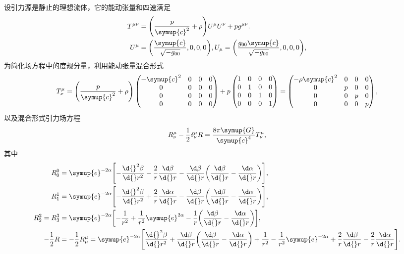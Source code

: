 \documentclass[UTF8, 12pt, a4paper, oneside, onecolumn, fontset=none]{ctexart}
\begin{document}
设引力源是静止的理想流体，它的能动张量和四速满足
\begin{align}
T^{\mu\nu}&=\mleft(\frac{p}{\symup{c}^{2}}+\rho\mright) U^{\mu}U^{\nu}+pg^{\mu\nu}.\\
U^{\mu}&=\mleft(\frac{\symup{c}}{\sqrt{-g_{00}}}, 0, 0, 0\mright), U_{\mu}=\mleft(\frac{g_{00}\symup{c}}{\sqrt{-g_{00}}}, 0, 0, 0\mright),
\end{align}
为简化场方程中的度规分量，利用能动张量混合形式
\begin{equation}
T^{\mu}_{\nu}=\mleft(\frac{p}{\symup{c}^{2}}+\rho\mright)
\begin{pmatrix}
-\symup{c}^{2} & 0 & 0 & 0\\
0 & 0 & 0 & 0\\
0 & 0 & 0 & 0\\
0 & 0 & 0 & 0\\
\end{pmatrix}
+p\begin{pmatrix}
1 & 0 & 0 & 0\\
0 & 1 & 0 & 0\\
0 & 0 & 1 & 0\\
0 & 0 & 0 & 1\\
\end{pmatrix}
=\begin{pmatrix}
-\rho \symup{c}^{2} & 0 & 0 & 0\\
0 & p & 0 & 0\\
0 & 0 & p & 0\\
0 & 0 & 0 & p\\
\end{pmatrix},
\end{equation}
以及混合形式引力场方程
\begin{equation}
R^{\mu}_{\nu}-\frac{1}{2}\delta^{\mu}_{\nu}R=\frac{8\pi\symup{G}}{\symup{c}^{4}}T^{\mu}_{\nu},
\end{equation}
其中
\begin{align}
R^{0}_{0}&=\symup{e}^{-2\alpha}\mleft[-\frac{\d{}^{2}\beta}{\d{}r^{2}}-\frac{2}{r}\frac{\d\beta}{\d{}r}-\frac{\d\beta}{\d{}r}\mleft(\frac{\d\beta}{\d{}r}-\frac{\d\alpha}{\d{}r}\mright)\mright],\notag\\
R^{1}_{1}&=\symup{e}^{-2\alpha}\mleft[-\frac{\d{}^{2}\beta}{\d{}r^{2}}+\frac{2}{r}\frac{\d\alpha}{\d{}r}-\frac{\d\beta}{\d{}r}\mleft(\frac{\d\beta}{\d{}r}-\frac{\d\alpha}{\d{}r}\mright)\mright],\notag\\
R^{2}_{2}=R^{3}_{3}&=\symup{e}^{-2\alpha}\mleft[-\frac{1}{r^{2}}+\frac{1}{r^{2}}\symup{e}^{2\alpha}-\frac{1}{r}\mleft(\frac{\d\beta}{\d{}r}-\frac{\d\alpha}{\d{}r}\mright)\mright],\notag\\
-\frac{1}{2}R&=-\frac{1}{2}R^{\mu}_{\mu}=\symup{e}^{-2\alpha}\mleft[\frac{\d{}^{2}\beta}{\d{}r^{2}}+\frac{\d\beta}{\d{}r}\mleft(\frac{\d\beta}{\d{}r}-\frac{\d\alpha}{\d{}r}\mright)+\frac{1}{r^{2}}-\frac{1}{r^{2}}\symup{e}^{-2\alpha}+\frac{2}{r}\frac{\d\beta}{\d{}r}-\frac{2}{r}\frac{\d\alpha}{\d{}r}\mright].\notag
\end{align}
\end{document}
